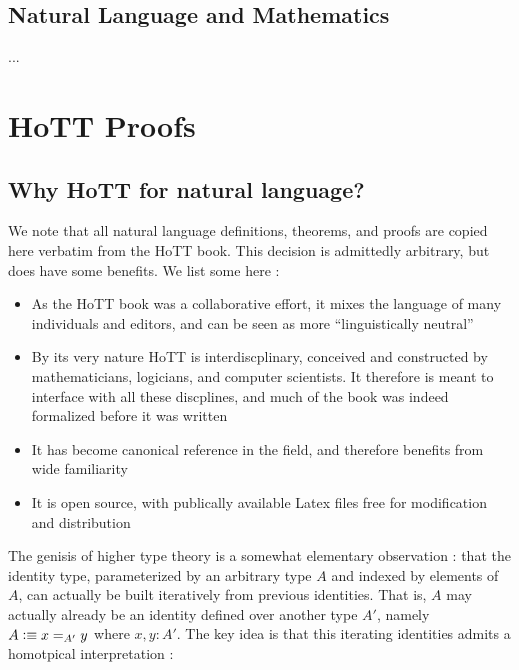 \documentclass[11pt, a4paper]{article}
\newcommand{\defeq}{\vcentcolon\equiv}  %
\begin{document}
\subsection{Natural Language and Mathematics}

...

\section{HoTT Proofs}

\subsection{Why HoTT for natural language?}

We note that all natural language definitions, theorems, and proofs are copied
here verbatim from the HoTT book.  This decision is admittedly arbitrary, but
does have some benefits.  We list some here : 

\begin{itemize}[noitemsep]

\item As the HoTT book was a collaborative effort, it mixes the language of
many individuals and editors, and can be seen as more ``linguistically
neutral''

\item By its very nature HoTT is interdiscplinary, conceived and constructed by
mathematicians, logicians, and computer scientists. It therefore is meant to
interface with all these discplines, and much of the book was indeed formalized
before it was written

\item It has become canonical reference in the field, and therefore benefits
from wide familiarity

\item It is open source, with publically available Latex files free for
modification and distribution

\end{itemize}

The genisis of higher type theory is a somewhat elementary observation : that
the identity type, parameterized by an arbitrary type $A$ and indexed by
elements of $A$, can actually be built iteratively from previous identities.
That is, $A$ may actually already be an identity defined over another type
$A'$, namely $A \defeq x=_{A'} y$ where $x,y:A'$. The key idea is that this
iterating identities admits a homotpical interpretation : 
\end{document}
